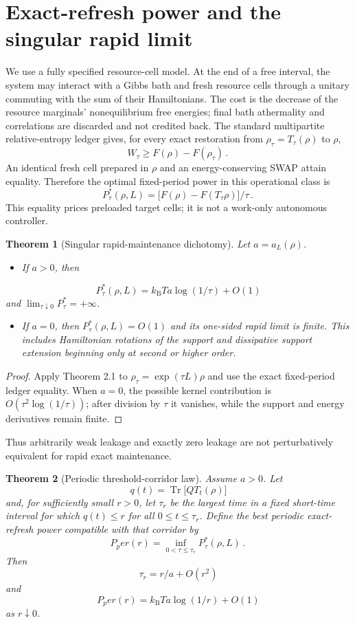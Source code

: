 \documentclass[11pt,a4paper]{article}
\newtheorem{theorem}{Theorem}[section]
\theoremstyle{remark}
\begin{document}
\section{Exact-refresh power and the singular rapid limit}
We use a fully specified resource-cell model. At the end of a free interval, the system may interact with a Gibbs bath and fresh resource cells through a unitary commuting with the sum of their Hamiltonians. The cost is the decrease of the resource marginals' nonequilibrium free energies; final bath athermality and correlations are discarded and not credited back.
The standard multipartite relative-entropy ledger gives, for every exact restoration from $\rho_\tau=T_\tau(\rho)$ to $\rho$,
\[
W_\tau\ge F(\rho)-F(\rho_\tau)\mathpunct{.}
\]
An identical fresh cell prepared in $\rho$ and an energy-conserving SWAP attain equality. Therefore the optimal fixed-period power in this operational class is
\[
P_\tau^*(\rho,L)=\bigl[F(\rho)-F(T_\tau \rho)\bigr]/\tau\mathpunct{.}
\]
This equality prices preloaded target cells; it is not a work-only autonomous controller.
\begin{theorem}[Singular rapid-maintenance dichotomy]
Let $a=a_L(\rho)$.
\begin{itemize}
\item If $a>0$, then
\end{itemize}
\[
P_\tau^*(\rho,L)=k_{\mathrm B} T a \log(1/\tau)+O(1)
\]
and $\lim_{\tau\downarrow 0}P_\tau^*=+\infty$.
\begin{itemize}
\item If $a=0$, then $P_\tau^*(\rho,L)=O(1)$ and its one-sided rapid limit is finite. This includes Hamiltonian rotations of the support and dissipative support extension beginning only at second or higher order.
\end{itemize}
\end{theorem}
\begin{proof}
Apply Theorem 2.1 to $\rho_\tau=\exp(\tau L)\rho$ and use the exact fixed-period ledger equality. When $a=0$, the possible kernel contribution is $O(\tau^{2} \log(1/\tau))$; after division by $\tau$ it vanishes, while the support and energy derivatives remain finite.
\end{proof}
Thus arbitrarily weak leakage and exactly zero leakage are not perturbatively equivalent for rapid exact maintenance.
\begin{theorem}[Periodic threshold-corridor law]
Assume $a>0$. Let
\[
q(t)=\operatorname{Tr}\bigl[Q T_t(\rho)\bigr]
\]
and, for sufficiently small $r>0$, let $\tau_r$ be the largest time in a fixed short-time interval for which $q(t)\le r$ for all $0\le t\le \tau_r$. Define the best periodic exact-refresh power compatible with that corridor by
\[
P_per(r)=\inf_{0<\tau\le \tau_r} P_\tau^*(\rho,L)\mathpunct{.}
\]
Then
\[
\tau_r=r/a+O(r^{2})
\]
and
\[
P_per(r)=k_{\mathrm B} T a \log(1/r)+O(1)
\]
as $r\downarrow 0$.
\end{theorem}
\end{document}
